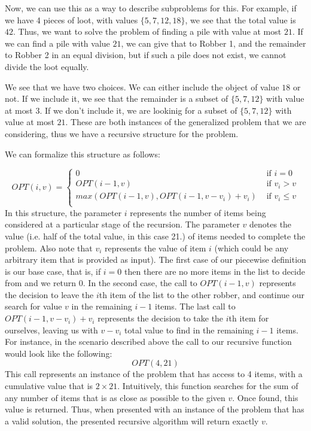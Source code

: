 \documentclass{article}
\begin{document}
Now, we can use this as a way to describe subproblems for this.  For example, if we have 4 pieces of loot, with values $\{5,7,12,18\}$, we see that the total value is $42$.  Thus, we want to solve the problem of finding a pile with value at most $21$.  If we can find a pile with value $21$, we can give that to Robber 1, and the remainder to Robber 2 in an equal division, but if such a pile does not exist, we cannot divide the loot equally.

We see that we have two choices.  We can either include the object of value $18$ or not.  If we include it, we see that the remainder is a subset of $\{5,7,12\}$ with value at most $3$.  If we don't include it, we are lookinig for a subset of $\{5,7,12\}$ with value at most $21$.  These are both instances of the generalized problem that we are considering, thus we have a recursive structure for the problem.

We can formalize this structure as follows:

\[ OPT(i, v) = \begin{cases} 
	  0 & \textrm{ if $i = 0$}\\
      OPT(i-1, v) & \textrm{ if $v_{i} > v$} \\
      max(OPT(i-1, v), OPT(i-1, v-v_{i}) + v_{i}) & \textrm{ if $v_{i} \leq v$} \\
\end{cases} \]
In this structure, the parameter $i$ represents the number of items being considered at a particular stage of the recursion. The parameter $v$ denotes the value (i.e. half of the total value, in this case 21.) of items needed to complete the problem. Also note that $v_{i}$ represents the value of item $i$ (which could be any arbitrary item that is provided as input). The first case of our piecewise definition is our base case, that is, if $i = 0$ then there are no more items in the list to decide from and we return $0$. In the second case, the call to $OPT(i-1, v)$ represents the decision to leave the $i$th item of the list to the other robber, and continue our search for value $v$ in the remaining $i - 1$ items. The last call to $OPT(i-1, v-v_{i}) + v_{i}$ represents the decision to take the $i$th item for ourselves, leaving us with $v - v_{i}$ total value to find in the remaining $i - 1$ items. For instance, in the scenario described above the call to our recursive function would look like the following:
\begin{equation*}
	OPT(4, 21)
\end{equation*}
This call represents an instance of the problem that has access to 4 items, with a cumulative value that is $2 \times 21$. Intuitively, this function searches for the sum of any number of items that is as close as possible to the given $v$. Once found, this value is returned. Thus, when presented with an instance of the problem that has a valid solution, the presented recursive algorithm will return exactly $v$.
\end{document}
